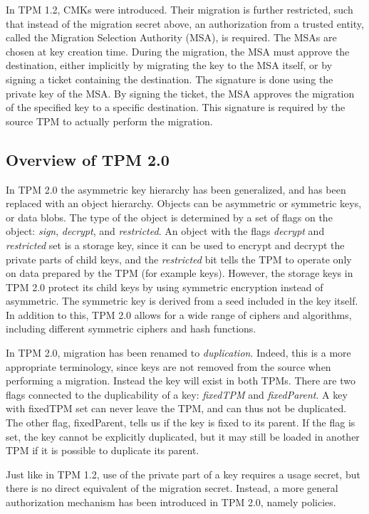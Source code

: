 {In TPM 1.2, CMKs were introduced. Their migration is further restricted, such that instead of the migration secret above, an authorization from a trusted entity, called the Migration Selection Authority (MSA), is required. The MSAs are chosen at key creation time. During the migration, the MSA must approve the destination, either implicitly by migrating the key to the MSA itself, or by signing a ticket containing the destination. The signature is done using the private key of the MSA. By signing the ticket, the MSA approves the migration of the specified key to a specific destination. This signature is required by the source TPM to actually perform the migration.

\subsection{Overview of TPM 2.0}
In TPM 2.0 the asymmetric key hierarchy has been generalized, and has been replaced with an object hierarchy. Objects can be asymmetric or symmetric keys, or data blobs. The type of the object is determined by a set of flags on the object: \emph{sign}, \emph{decrypt}, and \emph{restricted}. An object with the flags \emph{decrypt} and \emph{restricted} set is a storage key, since it can be used to encrypt and decrypt the private parts of child keys, and the \emph{restricted} bit tells the TPM to operate only on data prepared by the TPM (for example keys). However, the storage keys in TPM 2.0 protect its child keys by using symmetric encryption instead of asymmetric. The symmetric key is derived from a seed included in the key itself. In addition to this, TPM 2.0 allows for a wide range of ciphers and algorithms, including different symmetric ciphers and hash functions.

In TPM 2.0, migration has been renamed to \emph{duplication}. Indeed, this is a more appropriate terminology, since keys are not removed from the source when performing a migration. Instead the key will exist in both TPMs. There are two flags connected to the duplicability of a key: \emph{fixedTPM} and \emph{fixedParent}. A key with fixedTPM set can never leave the TPM, and can thus not be duplicated. The other flag, fixedParent, tells us if the key is fixed to its parent. If the flag is set, the key cannot be explicitly duplicated, but it may still be loaded in another TPM if it is possible to duplicate its parent.

Just like in TPM 1.2, use of the private part of a key requires a usage secret, but there is no direct equivalent of the migration secret. Instead, a more general authorization mechanism has been introduced in TPM 2.0, namely policies.

}
